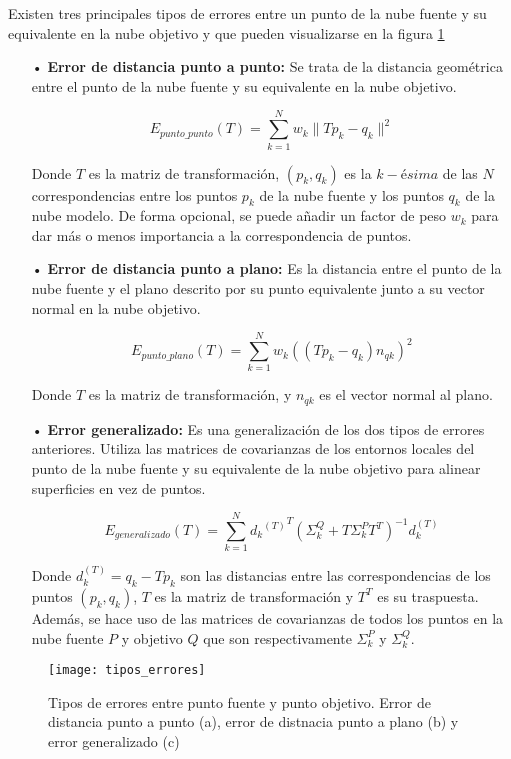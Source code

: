 Existen tres principales tipos de errores\cite{paper_registration} entre un punto de la nube fuente y su equivalente en la nube objetivo y que pueden visualizarse en la figura \ref{fig:tipos_errores} 
\begin{itemize}
\item[•]\textbf{Error de distancia punto a punto:}
Se trata de la distancia geométrica entre el punto de la nube fuente y su equivalente en la nube objetivo.

$$E_{punto\_punto}(T)=\sum_{k=1}^{N} w_{k}\| Tp_{k}-q_{k} \|^2$$

Donde $T$ es la matriz de transformación, $(p_{k},q_{k})$ es la $k-ésima$ de las $N$ correspondencias entre los puntos $p_k$ de la nube fuente y los puntos $q_k$ de la nube modelo. De forma opcional, se puede añadir un factor de peso $w_k$ para dar más o menos importancia a la correspondencia de puntos.

\item[•]\textbf{Error de distancia punto a plano:}
Es la distancia entre el punto de la nube fuente y el plano descrito por su punto equivalente junto a su vector normal en la nube objetivo.

$$E_{punto\_plano}(T)=\sum_{k=1}^{N} w_{k} ((Tp_{k}-q_{k})n_{qk}) ^2$$

Donde $T$ es la matriz de transformación, y $n_{qk}$ es el vector normal al plano.

\item[•]\textbf{Error generalizado:}
Es una generalización de los dos tipos de errores anteriores. Utiliza las matrices de covarianzas de los entornos locales del punto de la nube fuente y su equivalente de la nube objetivo para alinear superficies en vez de puntos.

$$E_{generalizado}(T)=\sum_{k=1}^{N} {{d_{k}}^{(T)}}^{T} (\Sigma_{k}^{Q}+T\Sigma_{k}^{P}T^{T})^{-1}d_{k}^{(T)}$$

Donde $d_{k}^{(T)}=q_{k}-Tp_{k}$ son las distancias entre las correspondencias de los puntos $(p_{k},q_{k})$, $T$ es la matriz de transformación y $T^T$ es su traspuesta. Además, se hace uso de las matrices de covarianzas de todos los puntos en la nube fuente $P$ y objetivo $Q$ que son respectivamente $\Sigma_{k}^{P}$ y $\Sigma_{k}^{Q}$.
\end{itemize}
\begin{figure}
\centering
\texttt{[image: tipos\_errores]}
\caption{Tipos de errores entre punto fuente y punto objetivo. Error de distancia punto a punto (a), error de distnacia punto a plano (b) y error generalizado (c)}\label{fig:tipos_errores}
\end{figure}

